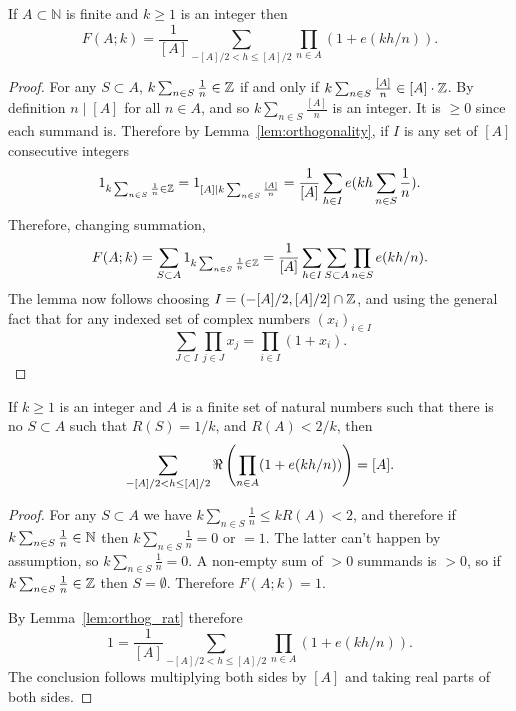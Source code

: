 \begin{lemma}\label{lem:orthog_rat}
If $A\subset\mathbb{N}$ is finite and $k\geq 1$ is an integer then
\[F(A;k)= \frac{1}{[A]}\sum_{-[A]/2< h\leq [A]/2}\prod_{n\in A}(1+e(kh/n)).\]
\end{lemma}
\begin{proof}
For any $S\subset A$,  $k\sum_{n\in S}\frac{1}{n}\in \mathbb{Z}$ if and only if $k\sum_{n\in S}\frac{[A]}{n}\in [A]\cdot \mathbb{Z}$. By definition $n\mid [A]$ for all $n\in A$, and so $k\sum_{n\in S}\frac{[A]}{n}$ is an integer. It is $\geq 0$ since each summand is. Therefore by Lemma~\ref{lem:orthogonality}, if $I$ is any set of $[A]$ consecutive integers
\[1_{k\sum_{n\in S}\frac{1}{n}\in \mathbb{Z}}=1_{[A]\mid k\sum_{n\in S}\frac{[A]}{n}} = \frac{1}{[A]}\sum_{h\in I}e(kh\sum_{n\in S}\frac{1}{n}).\]
Therefore, changing summation,
\[F(A;k) = \sum_{S\subset A}1_{k\sum_{n\in S}\frac{1}{n}\in \mathbb{Z}} = \frac{1}{[A]} \sum_{h\in I}\sum_{S\subset A}\prod_{n\in S}e(kh/n).\]
The lemma now follows choosing $I=(-[A]/2,[A]/2]\cap\mathbb{Z}$, and using the general fact that for any indexed set of complex numbers $(x_i)_{i\in I}$
\[\sum_{J\subset I}\prod_{j\in J}x_j = \prod_{i\in I}(1+x_i).\]
\end{proof}

\begin{lemma}\label{lem:orthog_simp}
If $k\geq 1$ is an integer and $A$ is a finite set of natural numbers such that there is no $S\subset A$ such that $R(S)=1/k$, and $R(A)<2/k$, then
\[\sum_{-[A]/2< h\leq [A]/2}\Re\left( \prod_{n\in A}(1+e(kh/n))\right)= [A].\]
\end{lemma}
\begin{proof}
For any $S\subset A$ we have $k\sum_{n\in S}\frac{1}{n}\leq kR(A)<2$, and therefore if $k\sum_{n\in S}\frac{1}{n} \in \mathbb{N}$ then $k\sum_{n\in S}\frac{1}{n} =0$ or $=1$. The latter can't happen by assumption, so $k\sum_{n\in S}\frac{1}{n} =0$. A non-empty sum of $>0$ summands is $>0$, so if $k\sum_{n\in S}\frac{1}{n}\in \mathbb{Z}$ then $S=\emptyset$. Therefore $F(A;k)=1$.

By Lemma~\ref{lem:orthog_rat} therefore
\[1=\frac{1}{[A]}\sum_{-[A]/2< h\leq [A]/2}\prod_{n\in A}(1+e(kh/n)).\]
The conclusion follows multiplying both sides by $[A]$ and taking real parts of both sides.
\end{proof}

